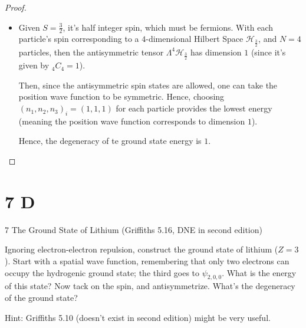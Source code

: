 \documentclass{article}
\begin{document}
\begin{proof}
\begin{itemize}
        Hence, the degeneracy of ground state energy is $6$.

        \hfil

        \item[(d)] Given $S=\frac{3}{2}$, it's half integer spin, which must be fermions. With each particle's spin corresponding to a $4$-dimensional Hilbert Space $\mathcal{H}_\frac{3}{2}$, and $N=4$ particles, then the antisymmetric tensor $\Lambda^4 \mathcal{H}_\frac{3}{2}$ has dimension $1$ (since it's given by $_4 C_4 = 1$).
        
        Then, since the antisymmetric spin states are allowed, one can take the position wave function to be symmetric. Hence, choosing $(n_1,n_2,n_3)_i = (1,1,1)$ for each particle provides the lowest energy (meaning the position wave function corresponds to dimension $1$).

        Hence, the degeneracy of te ground state energy is $1$.
    \end{itemize}
\end{proof}

\newpage

\section*{7 D} %
\begin{ques}
7 The Ground State of Lithium (Griffiths 5.16, DNE in second edition)

Ignoring electron-electron repulsion, construct the ground state of lithium ($Z = 3$). Start
with a spatial wave function, remembering that only two electrons can occupy the hydrogenic ground state; the third goes to $\psi_{2,0,0}$. What is the energy of this state? Now tack on
the spin, and antisymmetrize. What’s the degeneracy of the ground state?

Hint: Griffiths 5.10 (doesn’t exist in second edition) might be very useful.
\end{ques}
\end{document}
